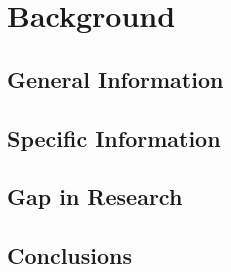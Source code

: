 \chapter{Background}\label{ch:Background}
  \section{General Information}\label{sec:generalInformation}
    \lipsum[23-25]
  \section{Specific Information}\label{sec:specificInformation}
    \lipsum[35-37]
  \section{Gap in Research}\label{sec:gapInResearch}
    \lipsum[42-43]
  \section{Conclusions}\label{sec:backgroundConclusions}
    \lipsum[12-13]
